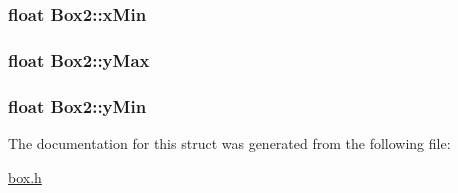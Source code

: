 \subsubsection[{\texorpdfstring{x\+Min}{xMin}}]{\setlength{\rightskip}{0pt plus 5cm}float Box2\+::x\+Min}\hypertarget{structBox2_a99630f8c30f5c15831e86b009bca148d}{}\label{structBox2_a99630f8c30f5c15831e86b009bca148d}
\subsubsection[{\texorpdfstring{y\+Max}{yMax}}]{\setlength{\rightskip}{0pt plus 5cm}float Box2\+::y\+Max}\hypertarget{structBox2_ab40c4b0a0b8c510402b97a16ece7fd58}{}\label{structBox2_ab40c4b0a0b8c510402b97a16ece7fd58}
\subsubsection[{\texorpdfstring{y\+Min}{yMin}}]{\setlength{\rightskip}{0pt plus 5cm}float Box2\+::y\+Min}\hypertarget{structBox2_ac5081aaad7feba1664d76fc42ea307d7}{}\label{structBox2_ac5081aaad7feba1664d76fc42ea307d7}


The documentation for this struct was generated from the following file\+:\begin{DoxyCompactItemize}
\item 
\hyperlink{box_8h}{box.\+h}\end{DoxyCompactItemize}
